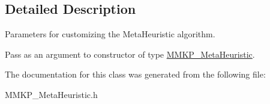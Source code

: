 \subsection{Detailed Description}
Parameters for customizing the Meta\+Heuristic algorithm. 

Pass as an argument to constructor of type \hyperlink{class_m_m_k_p___meta_heuristic}{M\+M\+K\+P\+\_\+\+Meta\+Heuristic}. 

The documentation for this class was generated from the following file\+:\begin{DoxyCompactItemize}
\item 
M\+M\+K\+P\+\_\+\+Meta\+Heuristic.\+h\end{DoxyCompactItemize}
